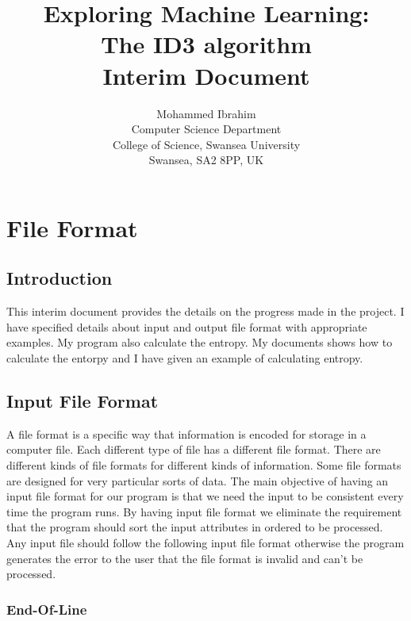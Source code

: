\documentclass{report}
\begin{document}
\title{Exploring Machine Learning:\\
  The ID3 algorithm\\
  		Interim Document}


\author{Mohammed Ibrahim\\
 Computer Science Department\\
  College of Science, Swansea University\\
  Swansea, SA2 8PP, UK
}
\date{}
\maketitle

\tableofcontents

\chapter{File Format}
\label{sec:fileformat}

\section{Introduction}
\label{introd}

This interim document provides the details on the progress made in the project. I have specified details about input and output file format with appropriate examples. My program also calculate the entropy. My documents shows how to calculate the entorpy and I have given an example of calculating entropy.

\section{Input File Format}
\label{sec:file}

A file format is a specific way that information is encoded for storage in a computer file. Each different type of file has a different file format. There are different kinds of file formats for different kinds of information. Some file formats are designed for very particular sorts of data. 
The main objective of having an input file format for our program is that we need the input to be consistent every time the program runs. By having input file format we eliminate the requirement that the program should sort the input attributes in ordered to be processed.
Any input file should follow the following input file format otherwise the program generates the error to the user that the file format is invalid and can't be processed.

\subsection{End-Of-Line}
\label{sec:Eol}
\end{document}
